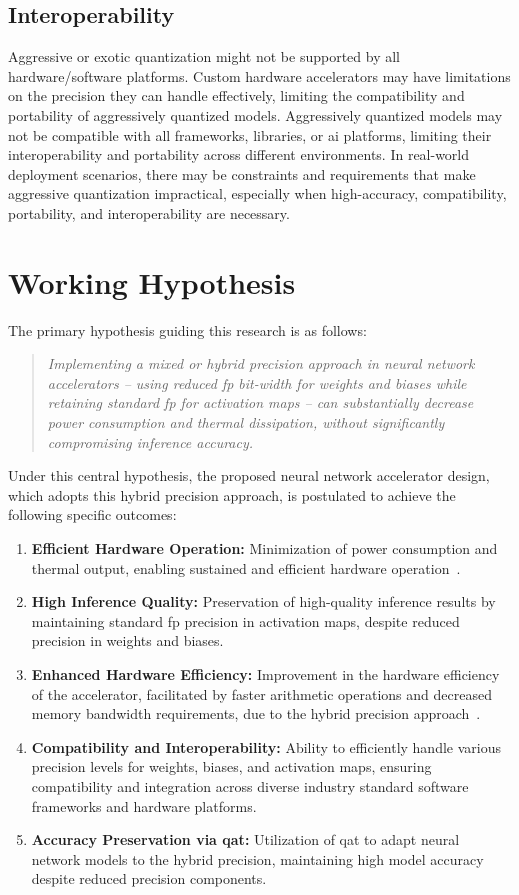\subsection{Interoperability}
Aggressive or exotic quantization might not be supported by all hardware/software platforms. Custom hardware accelerators may have limitations on the precision they can handle effectively, limiting the compatibility and portability of aggressively quantized models. Aggressively quantized models may not be compatible with all frameworks, libraries, or \gls{ai} platforms, limiting their interoperability and portability across different environments. In real-world deployment scenarios, there may be constraints and requirements that make aggressive quantization impractical, especially when high-accuracy, compatibility, portability, and interoperability are necessary.
\section{Working Hypothesis}

The primary hypothesis guiding this research is as follows:

\begin{quote}
	\textit{Implementing a mixed or hybrid precision approach in neural network accelerators -- using reduced \gls{fp} bit-width for weights and biases while retaining standard \gls{fp} for activation maps -- can substantially decrease power consumption and thermal dissipation, without significantly compromising inference accuracy.}
\end{quote}

Under this central hypothesis, the proposed neural network accelerator design, which adopts this hybrid precision approach, is postulated to achieve the following specific outcomes:

\begin{enumerate}[label={\textbf{H\arabic*}}]
	\item \textbf{Efficient Hardware Operation:} Minimization of power consumption and thermal output, enabling sustained and efficient hardware operation~\cite{lai2017deep}.
	\item \textbf{High Inference Quality:} Preservation of high-quality inference results by maintaining standard \gls{fp} precision in activation maps, despite reduced precision in weights and biases.
	\item \textbf{Enhanced Hardware Efficiency:} Improvement in the hardware efficiency of the accelerator, facilitated by faster arithmetic operations and decreased memory bandwidth requirements, due to the hybrid precision approach~\cite{lai2017deep}.
	\item \textbf{Compatibility and Interoperability:} Ability to efficiently handle various precision levels for weights, biases, and activation maps, ensuring compatibility and integration across diverse industry standard software frameworks and hardware platforms.
	\item \textbf{Accuracy Preservation via \gls{qat}:} Utilization of \gls{qat} to adapt neural network models to the hybrid precision, maintaining high model accuracy despite reduced precision components.
\end{enumerate}

